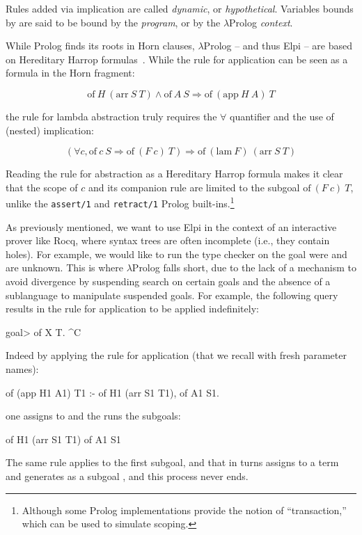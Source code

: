 \documentclass{these-ISSS}
\newenvironment{elpicode}
  {\VerbatimEnvironment\begin{elpibox}\begin{xelpicode}}{\end{xelpicode}
\end{elpibox}}
\newenvironment{elpioutput}
  {\VerbatimEnvironment\begin{outputbox}\begin{xelpicode}}{\end{xelpicode}
\end{outputbox}}
\begin{document}
Rules added via implication are called \emph{dynamic}, or \emph{hypothetical}.
Variables bounds by  are said to be bound by the \emph{program},
or by the $\lambda$Prolog \emph{context}.


While Prolog finds its roots in Horn clauses, $\lambda$Prolog -- and thus Elpi -- are
based on Hereditary Harrop formulas~\cite{Miller_Nadathur_2012}. While the rule
for application can be seen as a formula in the Horn fragment:

$$
\mathrm{of}~ H~(\mathrm{arr}~S~T) \land \mathrm{of}~A~S \Rightarrow
\mathrm{of}~(\mathrm{app}~H~A)~T
$$

\noindent the rule for lambda abstraction truly requires the $\forall$
quantifier and the use of (nested) implication:

$$
(\forall c, \mathrm{of}~c~S \Rightarrow  \mathrm{of}~(F~c)~T) \Rightarrow
\mathrm{of}~(\mathrm{lam}~F)~(\mathrm{arr}~S~T)
$$

Reading the rule for abstraction as a Hereditary Harrop formula makes it clear
that the scope of $c$ and its companion rule are limited to the subgoal
$\mathrm{of}~(F~c)~T$, unlike the \texttt{assert/1} and \texttt{retract/1}
Prolog built-ins.\footnote{Although some Prolog implementations provide the
notion of ``transaction,'' which can be used to simulate scoping.}

As previously mentioned, we want to use Elpi in the context of an interactive
prover like Rocq, where syntax trees are often incomplete (i.e., they contain
holes). For example, we would like to run the type checker on the goal
 were  and  are unknown.
This is where $\lambda$Prolog falls short, due to the
lack of a mechanism to avoid divergence by suspending search on certain goals
and the absence of a sublanguage to manipulate suspended goals.
For example, the following query results in the rule for application to
be applied indefinitely:
\begin{elpioutput}
goal> of X T.
^C %
\end{elpioutput}
\noindent
Indeed by applying the rule for application (that we recall with fresh parameter names):
\begin{elpicode}
  of (app H1 A1) T1 :- of H1 (arr S1 T1), of A1 S1.
\end{elpicode}
\noindent
one assigns  to  and the runs the subgoals:
\begin{elpicode}
of H1 (arr S1 T1)
of A1 S1
\end{elpicode}
\noindent
The same rule applies to the first subgoal, and that in turns assigns to 
a term  and generates as a subgoal ,
and this process never ends.
\end{document}
